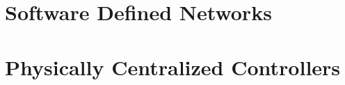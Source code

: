 
\section{Software Defined Networks}
\glsresetall
\label{sec:background:sdn}

\section{Physically Centralized  Controllers}
\glsresetall
\label{sec:background:centralized}
